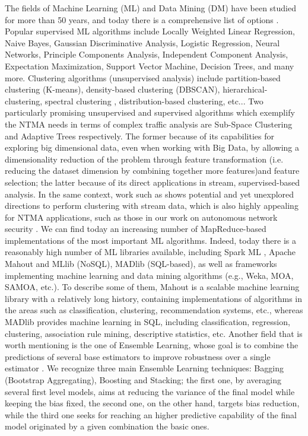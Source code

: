 \documentclass[10pt, conference, letterpaper]{IEEEtran}
\begin{document}
The fields of Machine Learning (ML) and Data Mining (DM) have been studied for more than 50 years, and today there is a comprehensive list of options \cite{bishop}. Popular supervised ML algorithms include Locally Weighted Linear Regression, Naive Bayes, Gaussian Discriminative Analysis, Logistic Regression, Neural Networks, Principle Components Analysis, Independent Component Analysis, Expectation Maximization, Support Vector Machine, Decision Trees, and many more. Clustering algorithms (unsupervised analysis) \cite{ml_1} include partition-based clustering (K-means), density-based clustering (DBSCAN), hierarchical-clustering, spectral clustering \cite{ml_3}, distribution-based clustering, etc... Two particularly promising unsupervised and supervised algorithms which exemplify the NTMA needs in terms of complex traffic analysis are Sub-Space Clustering \cite{ml_2} and Adaptive Trees \cite{fast_trees_1, fast_trees_2} respectively. The former because of its capabilities for exploring big dimensional data, even when working with Big Data, by allowing a dimensionality reduction of the problem through feature transformation (i.e. reducing the dataset dimension by combining together more features)and feature selection; the latter because of its direct applications in stream, supervised-based analysis. In the same context, work such as \cite{ml_4} shows potential and yet unexplored directions to perform clustering with stream data, which is also highly appealing for NTMA applications, such as those in our work on autonomous network security \cite{casas2012}. We can find today an increasing number of MapReduce-based implementations of the most important ML algorithms. Indeed, today there is a reasonably high number of ML libraries available, including Spark ML \cite{sparkml},  Apache Mahout \cite{mahout} and MLlib \cite{MLlib} (NoSQL), MADlib (SQL-based), as well as frameworks implementing machine learning and data mining algorithms (e.g., Weka, MOA, SAMOA, etc.). To describe some of them, Mahout is a scalable machine learning library with a relatively long history, containing implementations of algorithms in the areas such as classification, clustering, recommendation systems, etc., whereas MADlib provides machine learning in SQL, including classification, regression, clustering, association rule mining, descriptive statistics, etc. Another field that  is worth mentioning is the one of Ensemble Learning, whose goal is to combine the predictions of several base estimators to improve robustness over a single estimator \cite{sklearn}. We recognize three main Ensemble Learning techniques: Bagging (Bootstrap Aggregating), Boosting and Stacking; the first one, by averaging several first level models, aims at reducing the variance of the final model while keeping the bias fixed, the second one, on the other hand, targets bias reduction, while the third one seeks for reaching an higher predictive capability of the final model originated by a given combination the basic ones. 
\end{document}
